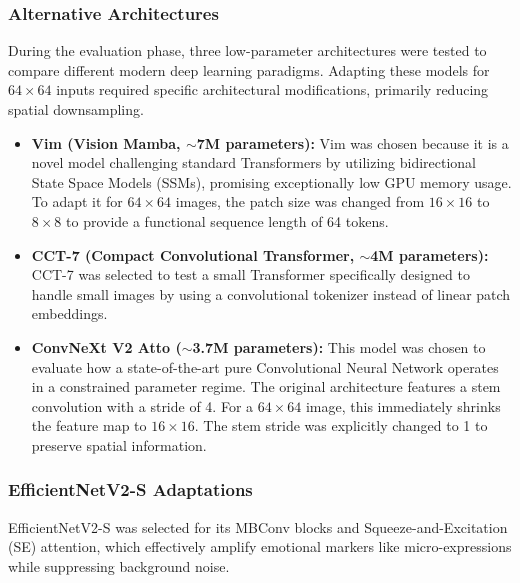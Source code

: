 \subsubsection{Alternative Architectures}
During the evaluation phase, three low-parameter architectures were tested to compare different modern deep learning paradigms. Adapting these models for $64 \times 64$ inputs required specific architectural modifications, primarily reducing spatial downsampling.

\begin{itemize}
    \item \textbf{Vim (Vision Mamba, $\sim$7M parameters):} Vim \cite{zhu2024visionmambaefficientvisual} was chosen because it is a novel model challenging standard Transformers by utilizing bidirectional State Space Models (SSMs), promising exceptionally low GPU memory usage. To adapt it for $64 \times 64$ images, the patch size was changed from $16 \times 16$ to $8 \times 8$ to provide a functional sequence length of 64 tokens.
    \item \textbf{CCT-7 (Compact Convolutional Transformer, $\sim$4M parameters):} CCT-7 \cite{hassani2022escapingbigdataparadigm} was selected to test a small Transformer specifically designed to handle small images by using a convolutional tokenizer instead of linear patch embeddings.
    \item \textbf{ConvNeXt V2 Atto ($\sim$3.7M parameters):} This model \cite{woo2023convnextv2codesigningscaling} was chosen to evaluate how a state-of-the-art pure Convolutional Neural Network operates in a constrained parameter regime. The original architecture features a stem convolution with a stride of 4. For a $64 \times 64$ image, this immediately shrinks the feature map to $16 \times 16$. The stem stride was explicitly changed to 1 to preserve spatial information.
\end{itemize}

\subsubsection{EfficientNetV2-S Adaptations}
EfficientNetV2-S \cite{tan2021efficientnetv2smallermodelsfaster} was selected for its MBConv blocks and Squeeze-and-Excitation (SE) attention, which effectively amplify emotional markers like micro-expressions while suppressing background noise.

